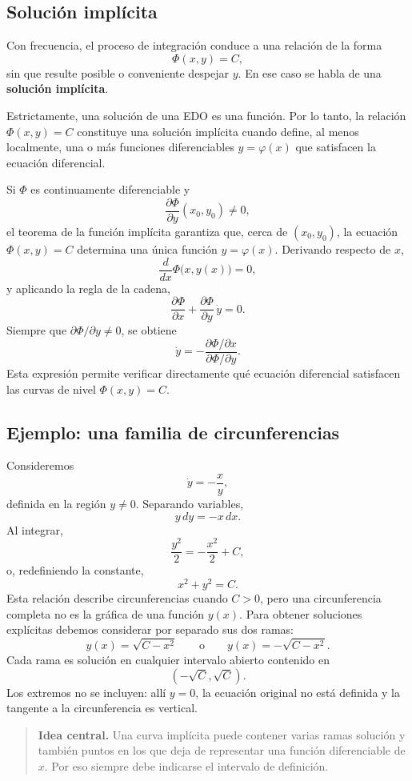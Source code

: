 \documentclass[12pt,a4paper]{article}
\begin{document}
	\subsection{Solución implícita}

	Con frecuencia, el proceso de integración conduce a una relación de la forma
	\[
	\Phi(x,y)=C,
	\]
sin que resulte posible o conveniente despejar \(y\). En ese caso se habla de una \textbf{solución implícita}.

	Estrictamente, una solución de una EDO es una función. Por lo tanto, la relación \(\Phi(x,y)=C\) constituye una solución implícita cuando define, al menos localmente, una o más funciones diferenciables \(y=\varphi(x)\) que satisfacen la ecuación diferencial.

	Si \(\Phi\) es continuamente diferenciable y
	\[
	\frac{\partial\Phi}{\partial y}(x_0,y_0)\neq 0,
	\]
el teorema de la función implícita garantiza que, cerca de \((x_0,y_0)\), la ecuación \(\Phi(x,y)=C\) determina una única función \(y=\varphi(x)\). Derivando respecto de \(x\),
	\[
	\frac{d}{dx}\Phi\bigl(x,y(x)\bigr)=0,
	\]
y aplicando la regla de la cadena,
	\[
	\frac{\partial\Phi}{\partial x}
	+
	\frac{\partial\Phi}{\partial y}\,\dot{y}=0.
	\]
Siempre que \(\partial\Phi/\partial y\neq 0\), se obtiene
	\[
	\dot{y}
	=-\frac{\partial\Phi/\partial x}{\partial\Phi/\partial y}.
	\]
Esta expresión permite verificar directamente qué ecuación diferencial satisfacen las curvas de nivel \(\Phi(x,y)=C\).

	\subsection{Ejemplo: una familia de circunferencias}

	Consideremos
	\[
	\dot{y}=-\frac{x}{y},
	\]
definida en la región \(y\neq 0\). Separando variables,
	\[
	y\,dy=-x\,dx.
	\]
Al integrar,
	\[
	\frac{y^2}{2}=-\frac{x^2}{2}+C,
	\]
o, redefiniendo la constante,
	\[
	x^2+y^2=C.
	\]
Esta relación describe circunferencias cuando \(C>0\), pero una circunferencia completa no es la gráfica de una función \(y(x)\). Para obtener soluciones explícitas debemos considerar por separado sus dos ramas:
	\[
	y(x)=\sqrt{C-x^2}
	\qquad\text{o}\qquad
	y(x)=-\sqrt{C-x^2}.
	\]
Cada rama es solución en cualquier intervalo abierto contenido en
	\[
	(-\sqrt{C},\sqrt{C}).
	\]
Los extremos no se incluyen: allí \(y=0\), la ecuación original no está definida y la tangente a la circunferencia es vertical.

	\begin{quote}
		\textbf{Idea central.} Una curva implícita puede contener varias ramas solución y también puntos en los que deja de representar una función diferenciable de \(x\). Por eso siempre debe indicarse el intervalo de definición.
	\end{quote}
\end{document}
